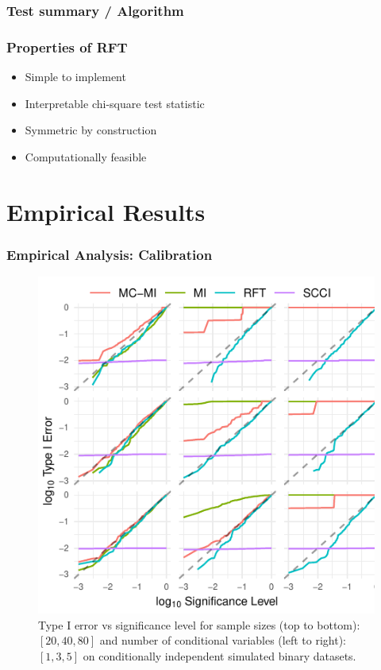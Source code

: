\documentclass{beamer}
\begin{document}
\begin{frame}
	\frametitle{Test summary / Algorithm}

\end{frame}

\begin{frame}
	\frametitle{Properties of RFT}
	\begin{itemize}
		\item Simple to implement
		\item Interpretable chi-square test statistic
		\item Symmetric by construction
		\item Computationally feasible
	\end{itemize}
\end{frame}

\section{Empirical Results}

\begin{frame}
	\frametitle{Empirical Analysis: Calibration}
	\begin{figure}
		\centering
		\includegraphics[scale=0.8]{imgs/calibration_add_vars.pdf}
		\caption{Type I error vs significance level for sample sizes (top to
		bottom): $ [20, 40, 80] $ and number of conditional variables (left to
		right): $ [1, 3, 5] $ on conditionally independent simulated binary
		datasets.}
	\end{figure}
\end{frame}
\end{document}
